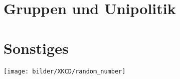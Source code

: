 \documentclass[]{papertex}
\begin{document}
	\section{Gruppen und Unipolitik}
		\label{politik}
		\begin{multicols}{2}
		\end{multicols}
	\newpage
	\section{Sonstiges}
		\label{sonstiges}
		\begin{center}
		\texttt{[image: bilder/XKCD/random\_number]}
		\end{center}
		\begin{multicols}{2}
		\end{multicols}
		\begin{multicols}{2}
		
		\end{multicols}
		\newpage
		
\end{document}
